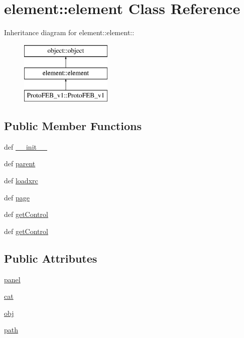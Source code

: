 \hypertarget{classelement_1_1element}{
\section{element::element Class Reference}
\label{classelement_1_1element}
}
Inheritance diagram for element::element::\begin{figure}[H]
\begin{center}
\leavevmode
\includegraphics[height=3cm]{classelement_1_1element}
\end{center}
\end{figure}
\subsection*{Public Member Functions}
\begin{DoxyCompactItemize}
\item 
def \hyperlink{classelement_1_1element_a7c08cd9a50e415b05efacce60b4511d2}{\_\-\_\-init\_\-\_\-}
\item 
def \hyperlink{classelement_1_1element_a2010faa4da4d94ff8deaaaf74bbc6ba3}{parent}
\item 
def \hyperlink{classelement_1_1element_a917516054d0cd3a641c57be859dbe370}{loadxrc}
\item 
def \hyperlink{classelement_1_1element_acb01482fd72cc106f0e16e08c4df276a}{page}
\item 
def \hyperlink{classobject_1_1object_ac765747a2b581d48eeb94e600c31fc3f}{getControl}
\item 
def \hyperlink{classobject_1_1object_ac765747a2b581d48eeb94e600c31fc3f}{getControl}
\end{DoxyCompactItemize}
\subsection*{Public Attributes}
\begin{DoxyCompactItemize}
\item 
\hyperlink{classelement_1_1element_abadf93bb1b1fa6f5fdd00dde996d0f2c}{panel}
\item 
\hyperlink{classobject_1_1object_a4fbaf843d1f40843b2c3895cb73ffada}{cat}
\item 
\hyperlink{classobject_1_1object_a15f13858ecdbf661a97a7da93d717922}{obj}
\item 
\hyperlink{classobject_1_1object_a6b4e1fd053496eafff2bc0f8aed7f089}{path}
\end{DoxyCompactItemize}


